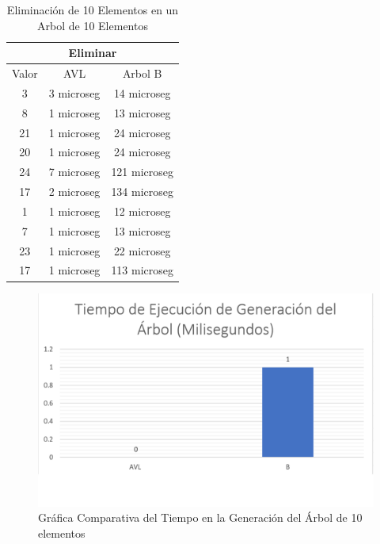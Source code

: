 \documentclass[acmsmall]{acmart}
\begin{document}
\begin{table}[htbp]
\begin{center}
  \caption{Eliminación de 10 Elementos en un Arbol de 10 Elementos}
  \begin{tabular}{ccc}
    \toprule
    \multicolumn{3}{c}{Eliminar}\\
    \midrule
     Valor & AVL & Arbol B  \\
     3 & 3 microseg&14 microseg \\
      8 &1 microseg&13 microseg \\
      21 &1 microseg&24 microseg \\
      20 & 1 microseg&24 microseg \\
      24&7 microseg&121 microseg \\
      17 &2 microseg& 134 microseg \\
      1 & 1 microseg&12 microseg \\
      7 & 1 microseg&13 microseg \\
       23 & 1 microseg&22 microseg \\
      17 &1 microseg&113 microseg \\

    \bottomrule
  \end{tabular}
  \end{center}
\end{table}


\begin{figure}[htbp]
  \centering
  \caption{Gráfica Comparativa del Tiempo en la Generación del Árbol de 10 elementos}

  \includegraphics[angle=0,scale=0.6]{10.1 elem.png}
  
\end{figure}
\end{document}
